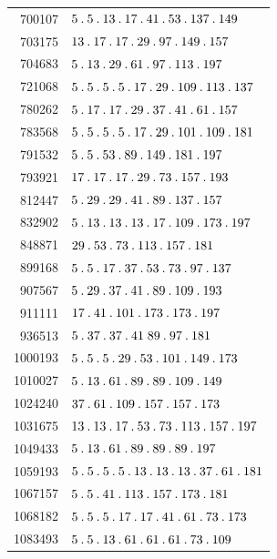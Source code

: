 \begin{longtable}{@{}r|l@{}}
700107 & $5\pdot 5\pdot 13\pdot 17\pdot 41\pdot 53\pdot 137\pdot 149$\\
703175 & $13\pdot 17\pdot 17\pdot 29\pdot 97\pdot 149\pdot 157$\\
704683 & $5\pdot 13\pdot 29\pdot 61\pdot 97\pdot 113\pdot 197$\\
721068 & $5\pdot 5\pdot 5\pdot 5\pdot 17\pdot 29\pdot 109\pdot 113\pdot 137$\\
780262 & $5\pdot 17\pdot 17\pdot 29\pdot 37\pdot 41\pdot 61\pdot 157$\\
783568 & $5\pdot 5\pdot 5\pdot 5\pdot 17\pdot 29\pdot 101\pdot 109\pdot 181$\\
791532 & $5\pdot 5\pdot 53\pdot 89\pdot 149\pdot 181\pdot 197$\\
793921 & $17\pdot 17\pdot 17\pdot 29\pdot 73\pdot 157\pdot 193$\\
812447 & $5\pdot 29\pdot 29\pdot 41\pdot 89\pdot 137\pdot 157$\\
832902 & $5\pdot 13\pdot 13\pdot 13\pdot 17\pdot 109\pdot 173\pdot 197$\\
848871 & $29\pdot 53\pdot 73\pdot 113\pdot 157\pdot 181$\\
899168 & $5\pdot 5\pdot 17\pdot 37\pdot 53\pdot 73\pdot 97\pdot 137$\\
907567 & $5\pdot 29\pdot 37\pdot 41\pdot 89\pdot 109\pdot 193$\\
911111 & $17\pdot 41\pdot 101\pdot 173\pdot 173\pdot 197$\\
936513 & $5\pdot 37\pdot 37\pdot 41\;89\pdot 97\pdot 181$\\
1000193 & $5\pdot 5\pdot 5\pdot 29\pdot 53\pdot 101\pdot 149\pdot 173$\\
1010027 & $5\pdot 13\pdot 61\pdot 89\pdot 89\pdot 109\pdot 149$\\
1024240 & $37\pdot 61\pdot 109\pdot 157\pdot 157\pdot 173$\\
1031675 & $13\pdot 13\pdot 17\pdot 53\pdot 73\pdot 113\pdot 157\pdot 197$\\
1049433 & $5\pdot 13\pdot 61\pdot 89\pdot 89\pdot 89\pdot 197$\\
1059193 & $5\pdot 5\pdot 5\pdot 5\pdot 13\pdot 13\pdot 13\pdot 37\pdot 61\pdot 181$\\
1067157 & $5\pdot 5\pdot 41\pdot 113\pdot 157\pdot 173\pdot 181$\\
1068182 & $5\pdot 5\pdot 5\pdot 17\pdot 17\pdot 41\pdot 61\pdot 73\pdot 173$\\
1083493 & $5\pdot 5\pdot 13\pdot 61\pdot 61\pdot 61\pdot 73\pdot 109$\\

\end{longtable}
